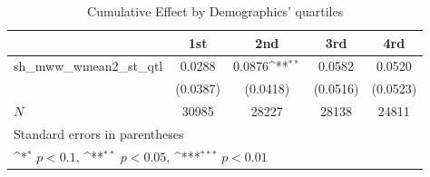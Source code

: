 \begin{table}[htbp]\centering
\def\sym#1{\ifmmode^{#1}\else\(^{#1}\)\fi}
\caption{Cumulative Effect by Demographics' quartiles}
\begin{tabular}{l*{4}{c}}
\hline\hline
            &\multicolumn{1}{c}{1st}&\multicolumn{1}{c}{2nd}&\multicolumn{1}{c}{3rd}&\multicolumn{1}{c}{4rd}\\
\hline
sh\_mww\_wmean2\_st\_qtl&      0.0288         &      0.0876\sym{**} &      0.0582         &      0.0520         \\
            &    (0.0387)         &    (0.0418)         &    (0.0516)         &    (0.0523)         \\
\hline
\(N\)       &       30985         &       28227         &       28138         &       24811         \\
\hline\hline
\multicolumn{5}{l}{\footnotesize Standard errors in parentheses}\\
\multicolumn{5}{l}{\footnotesize \sym{*} \(p<0.1\), \sym{**} \(p<0.05\), \sym{***} \(p<0.01\)}\\
\end{tabular}
\end{table}
